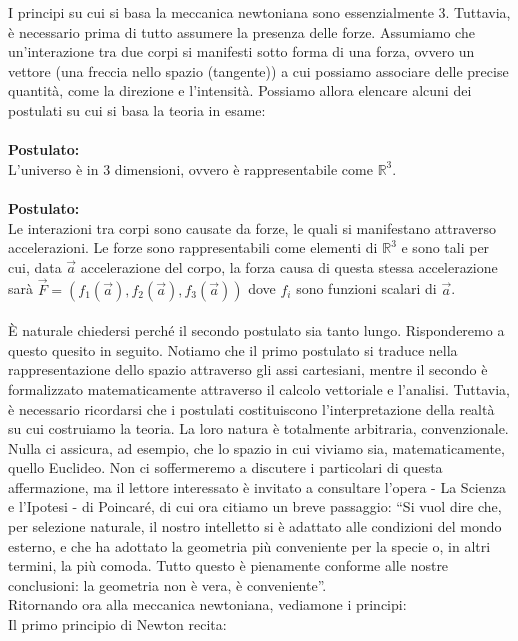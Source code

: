 \documentclass[]{article}
\begin{document}
	I principi su cui si basa la meccanica newtoniana sono essenzialmente 3. Tuttavia, è necessario prima di tutto assumere la presenza delle forze. Assumiamo che un'interazione tra due corpi si manifesti sotto forma di una forza, ovvero un vettore (una freccia nello spazio (tangente)) a cui possiamo associare delle precise quantità, come la direzione e l'intensità.		
	Possiamo allora elencare alcuni dei postulati su cui si basa la teoria in esame:
	\\\\
	\textbf{Postulato:}\\
	L'universo è in 3 dimensioni, ovvero è rappresentabile come $\mathbb{R}^3$.
	\\\\
	\textbf{Postulato:}\\
	Le interazioni tra corpi sono causate da forze, le quali si manifestano attraverso accelerazioni. Le forze sono rappresentabili come elementi di $\mathbb{R}^3$ e sono tali per cui, data $\vec{a}$ accelerazione del corpo, la forza causa di questa stessa accelerazione sarà $\vec{F}=(f_1(\vec{a}),f_2(\vec{a}),f_3(\vec{a}))$ dove $f_i$ sono funzioni scalari di $\vec{a}$.
	\\\\
	\`E naturale chiedersi perché il secondo postulato sia tanto lungo. Risponderemo a questo quesito in seguito. Notiamo che il primo postulato si traduce nella rappresentazione dello spazio attraverso gli assi cartesiani, mentre il secondo è formalizzato matematicamente attraverso il calcolo vettoriale e l'analisi. Tuttavia, è necessario ricordarsi che i postulati costituiscono l'interpretazione della realtà su cui costruiamo la teoria. La loro natura è totalmente arbitraria, convenzionale. Nulla ci assicura, ad esempio, che lo spazio in cui viviamo sia, matematicamente, quello Euclideo. Non ci soffermeremo a discutere i particolari di questa affermazione, ma il lettore interessato è invitato a consultare l'opera - La Scienza e l'Ipotesi - di Poincaré, di cui ora citiamo un breve passaggio: \enquote{Si vuol dire che, per selezione naturale, il nostro intelletto si è adattato alle condizioni del mondo esterno, e che ha adottato la geometria più conveniente per la specie o, in altri termini, la più comoda. Tutto questo è pienamente conforme alle nostre conclusioni: la geometria non è vera, è conveniente}.\\
	Ritornando ora alla meccanica newtoniana, vediamone i principi:\\
	Il primo principio di Newton recita: 
	\\\\
\end{document}
